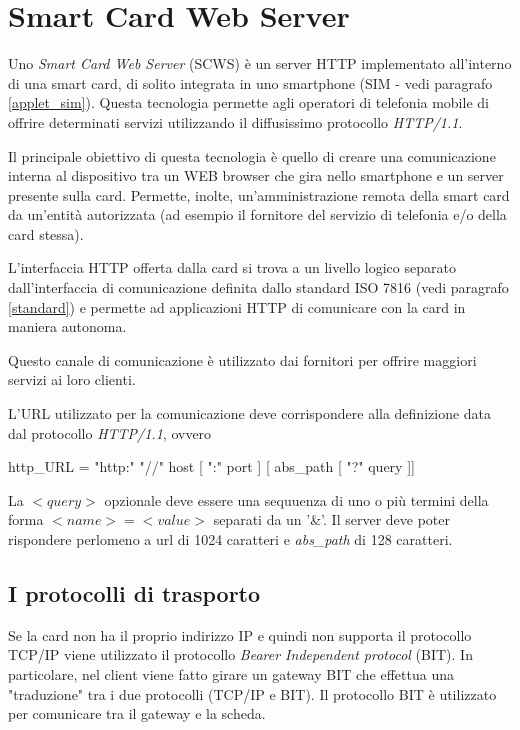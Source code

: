 \section{Smart Card Web Server}
\label{smart_card_web_server}
Uno \textit{Smart Card Web Server} (SCWS) è un server HTTP implementato all'interno di una smart card, di solito integrata in uno smartphone (SIM - vedi paragrafo \ref{applet_sim}). Questa tecnologia permette agli operatori di telefonia mobile di offrire determinati servizi utilizzando il diffusissimo protocollo \textit{HTTP/1.1}.

Il principale obiettivo di questa tecnologia è quello di creare una comunicazione interna al dispositivo tra un WEB browser che gira nello smartphone e un server presente sulla card. Permette, inolte, un'amministrazione remota della smart card da un'entità autorizzata (ad esempio il fornitore del servizio di telefonia e/o della card stessa).

L'interfaccia HTTP offerta dalla card si trova a un livello logico separato dall'interfaccia di comunicazione definita dallo standard ISO 7816 (vedi paragrafo \ref{standard}) e permette ad applicazioni HTTP di comunicare con la card in maniera autonoma.

Questo canale di comunicazione è utilizzato dai fornitori per offrire maggiori servizi ai loro clienti.

L'URL utilizzato per la comunicazione deve corrispondere alla definizione data dal protocollo \textit{HTTP/1.1}, ovvero

\begin{center}
    http\_URL = "http:" "//" host [ ":" port ] [ abs\_path [ "?" query ]]
\end{center}

La $<query>$ opzionale deve essere una sequuenza di uno o più termini della forma $<name>=<value>$ separati da un '\&'. Il server deve poter rispondere perlomeno a url di 1024 caratteri e \textit{abs\_path} di 128 caratteri.

\subsection{I protocolli di trasporto}
Se la card non ha il proprio indirizzo IP e quindi non supporta il protocollo TCP/IP viene utilizzato il protocollo \textit{ Bearer Independent protocol} (BIT). In particolare, nel client viene fatto girare un gateway BIT che effettua una "traduzione" tra i due protocolli (TCP/IP e BIT). Il protocollo BIT è utilizzato per comunicare tra il gateway e la scheda.

